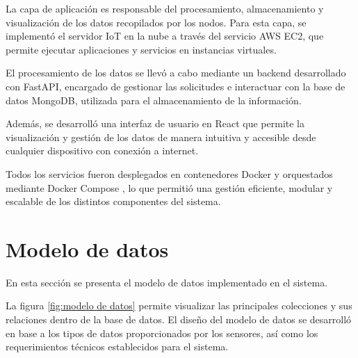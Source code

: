 La capa de aplicación es responsable del procesamiento, almacenamiento y
visualización de los datos recopilados por los nodos. Para esta capa, se
implementó el servidor IoT en la nube a través del servicio AWS EC2, que
permite ejecutar aplicaciones y servicios en instancias virtuales.


El procesamiento de los datos se llevó a cabo mediante un backend desarrollado
con FastAPI, encargado de gestionar las solicitudes e interactuar con la base
de datos MongoDB, utilizada para el almacenamiento de la información.

Además, se desarrolló una interfaz de usuario en React que permite la
visualización y gestión de los datos de manera intuitiva y accesible desde
cualquier dispositivo con conexión a internet.

Todos los servicios fueron desplegados en contenedores Docker y orquestados
mediante Docker Compose \cite{DockerCompose}, lo que permitió una gestión
eficiente, modular y escalable de los distintos componentes del sistema.

\section{Modelo de datos}

En esta sección se presenta el modelo de datos implementado en el sistema.

La figura \ref{fig:modelo de datos} permite visualizar las principales
colecciones y sus relaciones dentro de la base de datos. El diseño del modelo
de datos se desarrolló en base a los tipos de datos proporcionados por los
sensores, así como los requerimientos técnicos establecidos para el sistema.

